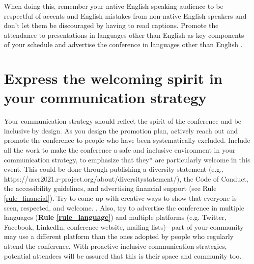 \documentclass[10pt,letterpaper]{article}
\begin{document}
When doing this, remember your native English speaking audience to be respectful of accents and English mistakes from non-native English speakers and don't let them be discouraged by having to read captions. 
Promote the attendance to presentations in languages other than English as key components of your schedule and advertise the conference in languages other than English . 




\section{Express the welcoming spirit in your communication strategy}
\label{rule_communication}

Your communication strategy should reflect the spirit of the conference and be inclusive by design. 
As you design the promotion plan, actively reach out and promote the conference to people who have been systematically excluded. 
Include all the work to make the conference a safe and inclusive environment in your communication strategy, 
to emphasize that they* are particularly welcome in this event. This could be done through publishing a diversity statement (e.g., https://user2021.r-project.org/about/diversitystatement/), the Code of Conduct, the accessibility guidelines, and advertising financial support (see Rule \ref{rule_financial}). Try to come up with creative ways to show that everyone is seen, respected, and welcome. .
Also, try to advertise the conference in multiple languages (\textbf{Rule \ref{rule_language}}) and multiple platforms (e.g. Twitter, Facebook, LinkedIn, conference website, mailing lists)--
part of your community may use a different platform than the ones adopted by people who regularly attend the conference. 
With proactive inclusive communication strategies, potential attendees will be assured that this is their space and community too.
\end{document}
